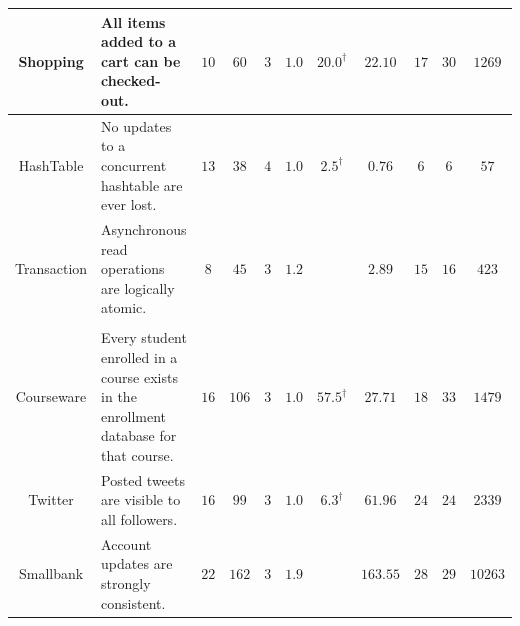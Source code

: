 \begin{table}[t!]
\begin{tabular}{c|P{5.0cm}||ccc||cc||c|ccc}
\midrule
\midrule
\textsf{Shopping}\cite{MonkeyDB} & {\scriptsize All items added to a cart can be checked-out.} & $10$ & $60$ & $3$ & $1.0$ & $20.0^{\dagger}$ & $22.10$ & $17$ & $30$ & $1269$\\
\midrule
\textsf{HashTable}\cite{OcamlMulticorePBT} & {\scriptsize No updates to a concurrent hashtable are ever lost.} & $13$ & $38$ & $4$ & $1.0$ & $2.5^{\dagger}$ & $0.76$ & $6$ & $6$ & $57$\\
\midrule
\textsf{Transaction} & {\scriptsize Asynchronous read operations are logically atomic.} & $8$ & $45$ & $3$ & $1.2$ & \timeout{} & $2.89$ & $15$ & $16$ & $423$\\
\midrule
{} &  &  &  &  & \cbnewadding{\timeout{}} & \cbnewadding{\timeout{}} &  &  &  & \\
\midrule
\textsf{Courseware}\cite{MonkeyDB} & {\scriptsize Every student enrolled in a course exists in the
  enrollment database for that course.} & $16$ & $106$ & $3$ & $1.0$ & $57.5^{\dagger}$ & $27.71$ & $18$ & $33$ & $1479$\\
\midrule
\textsf{Twitter}\cite{MonkeyDB} & {\scriptsize Posted tweets are visible to all followers.} & $16$ & $99$ & $3$ & $1.0$ & $6.3^{\dagger}$ & $61.96$ & $24$ & $24$ & $2339$\\
\midrule
\textsf{Smallbank}\cite{OLTPBench} & {\scriptsize Account updates are strongly consistent.} & $22$ & $162$ & $3$ & $1.9$ & \timeout{} & $163.55$ & $28$ & $29$ & $10263$\\
\bottomrule
\end{tabular}
\label{tab:evaluation}
\vspace*{-.15in}
\end{table}


